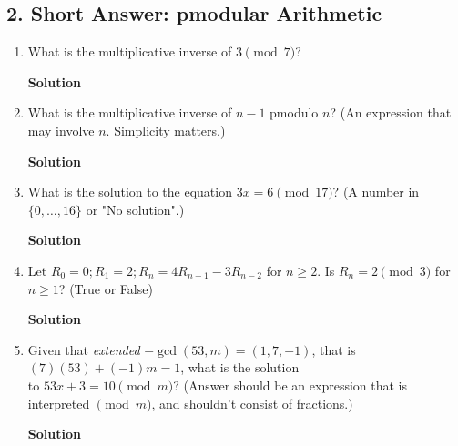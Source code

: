 \documentclass{article}\usepackage{amsmath,amssymb,amsthm,tikz,tkz-graph,color,chngpage,soul,hyperref,csquotes,graphicx,floatrow}\newcommand*{\QEDB}{\hfill\ensuremath{\square}}\newtheorem*{prop}{Proposition}\renewcommand{\theenumi}{\alph{enumi}}\usepackage[shortlabels]{enumitem}\usepackage[nobreak=true]{mdframed}\usetikzlibrary{matrix,calc}\MakeOuterQuote{"}\usepackage[margin=0.75in]{geometry}
\begin{document}
\subsection*{2. Short Answer: pmodular Arithmetic}
\begin{enumerate}
\item What is the multiplicative inverse of $3\pmod 7$?
\begin{mdframed}
\textbf{Solution}

\end{mdframed}
\item What is the multiplicative inverse of $n-1$ pmodulo $n$? (An expression that may involve $n$. Simplicity matters.)
\begin{mdframed}
\textbf{Solution}

\end{mdframed}
\item What is the solution to the equation $3x=6\pmod 17$? (A number in $\{0,\ldots,16\}$ or "No solution".)
\begin{mdframed}
\textbf{Solution}

\end{mdframed}
\item Let $R_0=0;R_1=2;R_n=4R_{n-1}-3R_{n-2}$ for $n\geqslant 2$. Is $R_n=2\pmod 3$ for $n\geqslant 1$? (True or False)
\begin{mdframed}
\textbf{Solution}

\end{mdframed}
\item Given that \textit{extended} $-\gcd(53,m)=(1,7,-1)$, that is $(7)(53)+(-1)m=1$, what is the solution \\ to $53x+3=10\pmod m$? (Answer should be an expression that is interpreted $\pmod m$, and shouldn't consist of fractions.)
\begin{mdframed}
\textbf{Solution}

\end{mdframed}
\end{enumerate}
\clearpage

\end{document}
